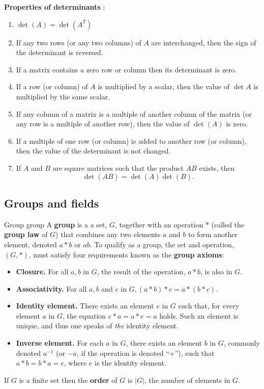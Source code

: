 \textbf{Properties of determinants} \cite{math1141_notes}:
\begin{enumerate}
	\item $\det (A) = \det (A^T)$
	\item If any two rows (or any two columns) of $A$ are interchanged, then the sign of the determinant is reversed.
	\item If a matrix contains a zero row or column then its determinant is zero.
	\item If a row (or column) of $A$ is multiplied by a scalar, then the value of $\det A$ is multiplied by the same scalar.
	\item If any column of a matrix is a multiple of another column of the matrix (or any row is a multiple of another row), then the value of $\det (A)$ is zero.
	\item If a multiple of one row (or column) is added to another row (or column), then the value of the determinant is not changed.
	\item If $A$ and $B$ are square matrices such that the product $AB$ exists, then
$$ \det (AB) = \det (A) \det (B) . $$
\end{enumerate}

\subsection{Groups and fields}

\begin{definition}{Group \cite{math2601_notes}}{group}
	A \textbf{group} is a a set, $G$, together with an operation $*$ (called the \textbf{group law} of $G$) that combines any two elements $a$ and $b$ to form another element, denoted $a * b$ or $ab$. To qualify as a group, the set and operation, $(G, *)$, must satisfy four requirements known as the \textbf{group axioms}:
	\begin{itemize}
		\item \textbf{Closure.} For all $a, b$ in $G$, the result of the operation, $a * b$, is also in $G$.
		\item \textbf{Associativity.} For all $a, b$ and $c$ in $G, (a * b) * c = a * (b * c)$.
		\item \textbf{Identity element.} There exists an element $e$ in $G$ such that, for every element $a$ in $G$, the equation $e * a = a * e = a$ holds. Such an element is unique, and thus one speaks of \textit{the} identity element.
		\item \textbf{Inverse element.} For each $a$ in $G$, there exists an element $b$ in $G$, commonly denoted $a^{-1}$ (or $-a$, if the operation is denoted ``$+$''), such that $a * b = b * a = e$, where $e$ is the identity element.
	\end{itemize}
	If $G$ is a finite set then the \textbf{order} of $G$ is $\lvert G \rvert$, the number of elements in $G$.
\end{definition}

